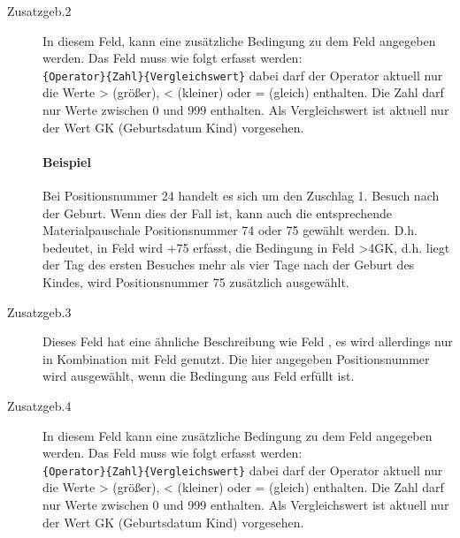 \begin{description}
\item[Zusatzgeb.2]
In diesem Feld, kann eine zusätzliche Bedingung zu dem Feld 
angegeben werden. Das Feld muss wie folgt erfasst werden:\\
\verb|{Operator}{Zahl}{Vergleichswert}| dabei darf der Operator aktuell nur
die Werte > (größer), < (kleiner) oder = (gleich) enthalten. Die Zahl darf
nur Werte zwischen 0 und 999 enthalten. Als Vergleichswert ist aktuell nur 
der Wert GK (Geburtsdatum Kind) vorgesehen.
\paragraph{Beispiel}
Bei Positionsnummer 24 handelt es sich um den Zuschlag 1. Besuch nach der
Geburt. Wenn dies der Fall ist, kann auch die entsprechende Materialpauschale
Positionsnummer 74 oder 75 gewählt werden. D.h. bedeutet, in Feld
 wird +75 erfasst, die Bedingung in Feld 
 >4GK, d.h. liegt der Tag des ersten Besuches mehr als vier
Tage nach der Geburt des Kindes, wird Positionsnummer 75 zusätzlich ausgewählt.
\item[Zusatzgeb.3]
Dieses Feld hat eine ähnliche Beschreibung wie Feld , es
wird allerdings nur in Kombination mit Feld  genutzt.
Die hier angegeben Positionsnummer wird ausgewählt, wenn die Bedingung aus
Feld  erfüllt ist.
\item[Zusatzgeb.4]
In diesem Feld kann eine zusätzliche Bedingung zu dem Feld 
angegeben werden. Das Feld muss wie folgt erfasst werden:\\
\verb|{Operator}{Zahl}{Vergleichswert}| dabei darf der Operator aktuell nur
die Werte > (größer), < (kleiner) oder = (gleich) enthalten. Die Zahl darf
nur Werte zwischen 0 und 999 enthalten. Als Vergleichswert ist aktuell nur 
der Wert GK (Geburtsdatum Kind) vorgesehen.

\end{description}
